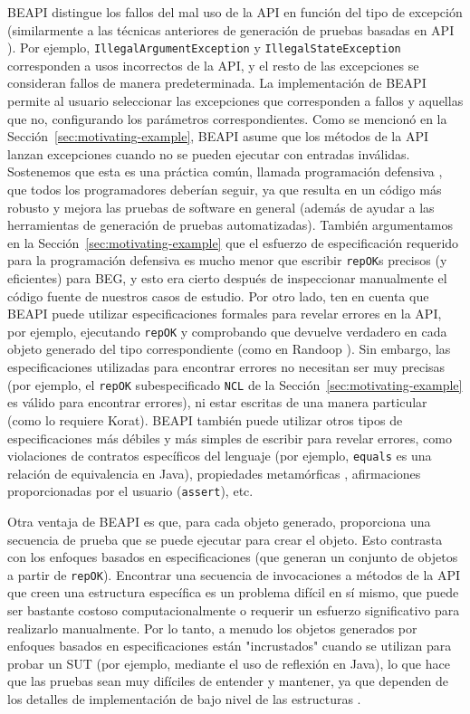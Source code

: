 \textsf{BEAPI} distingue los fallos del mal uso de la API en función del tipo de excepción (similarmente a las técnicas anteriores de generación de pruebas basadas en API \cite{Pacheco07}). Por ejemplo, \texttt{IllegalArgumentException} y \texttt{IllegalStateException} corresponden a usos incorrectos de la API, y el resto de las excepciones se consideran fallos de manera predeterminada. La implementación de \textsf{BEAPI} permite al usuario seleccionar las excepciones que corresponden a fallos y aquellas que no, configurando los parámetros correspondientes. Como se mencionó en la Sección~\ref{sec:motivating-example}, \textsf{BEAPI} asume que los métodos de la API lanzan excepciones cuando no se pueden ejecutar con entradas inválidas. Sostenemos que esta es una práctica común, llamada programación defensiva \cite{Liskov00}, que todos los programadores deberían seguir, ya que resulta en un código más robusto y mejora las pruebas de software en general \cite{Ammann16} (además de ayudar a las herramientas de generación de pruebas automatizadas). También argumentamos en la Sección~\ref{sec:motivating-example} que el esfuerzo de especificación requerido para la programación defensiva es mucho menor que escribir \texttt{repOK}s precisos (y eficientes) para BEG, y esto era cierto después de inspeccionar manualmente el código fuente de nuestros casos de estudio. Por otro lado, ten en cuenta que \textsf{BEAPI} puede utilizar especificaciones formales para revelar errores en la API, por ejemplo, ejecutando \texttt{repOK} y comprobando que devuelve verdadero en cada objeto generado del tipo correspondiente (como en Randoop \cite{Pacheco07}). Sin embargo, las especificaciones utilizadas para encontrar errores no necesitan ser muy precisas (por ejemplo, el \texttt{repOK} subespecificado \texttt{NCL} de la Sección~\ref{sec:motivating-example} es válido para encontrar errores), ni estar escritas de una manera particular (como lo requiere \textsf{Korat}). \textsf{BEAPI} también puede utilizar otros tipos de especificaciones más débiles y más simples de escribir para revelar errores, como violaciones de contratos específicos del lenguaje (por ejemplo, \texttt{equals} es una relación de equivalencia en Java), propiedades metamórficas \cite{Chen19}, afirmaciones proporcionadas por el usuario (\texttt{assert}), etc.

Otra ventaja de \textsf{BEAPI} es que, para cada objeto generado, proporciona una secuencia de prueba que se puede ejecutar para crear el objeto. Esto contrasta con los enfoques basados en especificaciones (que generan un conjunto de objetos a partir de \texttt{repOK}). Encontrar una secuencia de invocaciones a métodos de la API que creen una estructura específica es un problema difícil en sí mismo, que puede ser bastante costoso computacionalmente \cite{Braione17} o requerir un esfuerzo significativo para realizarlo manualmente. Por lo tanto, a menudo los objetos generados por enfoques basados en especificaciones están "incrustados" cuando se utilizan para probar un SUT (por ejemplo, mediante el uso de reflexión en Java), lo que hace que las pruebas sean muy difíciles de entender y mantener, ya que dependen de los detalles de implementación de bajo nivel de las estructuras \cite{Braione17}.

